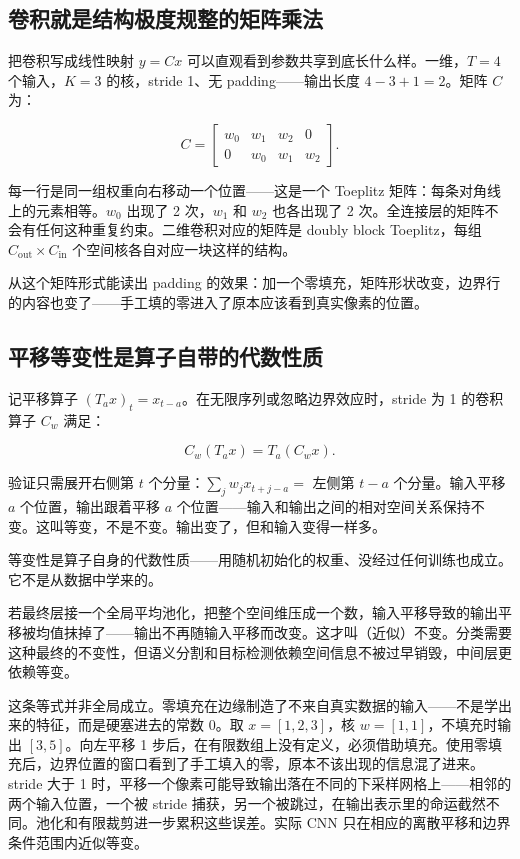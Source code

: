 \subsection{卷积就是结构极度规整的矩阵乘法}

把卷积写成线性映射 \(y = C x\) 可以直观看到参数共享到底长什么样。一维，\(T=4\) 个输入，\(K=3\) 的核，stride 1、无 padding——输出长度 \(4-3+1=2\)。矩阵 \(C\) 为：

\[
C = \begin{bmatrix}
w_0 & w_1 & w_2 & 0 \\
0 & w_0 & w_1 & w_2
\end{bmatrix}.
\]

每一行是同一组权重向右移动一个位置——这是一个 Toeplitz 矩阵：每条对角线上的元素相等。\(w_0\) 出现了 2 次，\(w_1\) 和 \(w_2\) 也各出现了 2 次。全连接层的矩阵不会有任何这种重复约束。二维卷积对应的矩阵是 doubly block Toeplitz，每组 \(C_{\mathrm{out}}\times C_{\mathrm{in}}\) 个空间核各自对应一块这样的结构。

从这个矩阵形式能读出 padding 的效果：加一个零填充，矩阵形状改变，边界行的内容也变了——手工填的零进入了原本应该看到真实像素的位置。

\subsection{平移等变性是算子自带的代数性质}

记平移算子 \((T_a x)_t = x_{t-a}\)。在无限序列或忽略边界效应时，stride 为 1 的卷积算子 \(C_w\) 满足：

\[
C_w(T_a x) = T_a(C_w x).
\]

验证只需展开右侧第 \(t\) 个分量：\(\sum_j w_j x_{t+j-a} =\) 左侧第 \(t-a\) 个分量。输入平移 \(a\) 个位置，输出跟着平移 \(a\) 个位置——输入和输出之间的相对空间关系保持不变。这叫等变，不是不变。输出变了，但和输入变得一样多。

等变性是算子自身的代数性质——用随机初始化的权重、没经过任何训练也成立。它不是从数据中学来的。

若最终层接一个全局平均池化，把整个空间维压成一个数，输入平移导致的输出平移被均值抹掉了——输出不再随输入平移而改变。这才叫（近似）不变。分类需要这种最终的不变性，但语义分割和目标检测依赖空间信息不被过早销毁，中间层更依赖等变。

这条等式并非全局成立。零填充在边缘制造了不来自真实数据的输入——不是学出来的特征，而是硬塞进去的常数 0。取 \(x=[1,2,3]\)，核 \(w=[1,1]\)，不填充时输出 \([3,5]\)。向左平移 1 步后，在有限数组上没有定义，必须借助填充。使用零填充后，边界位置的窗口看到了手工填入的零，原本不该出现的信息混了进来。stride 大于 1 时，平移一个像素可能导致输出落在不同的下采样网格上——相邻的两个输入位置，一个被 stride 捕获，另一个被跳过，在输出表示里的命运截然不同。池化和有限裁剪进一步累积这些误差。实际 CNN 只在相应的离散平移和边界条件范围内近似等变。

